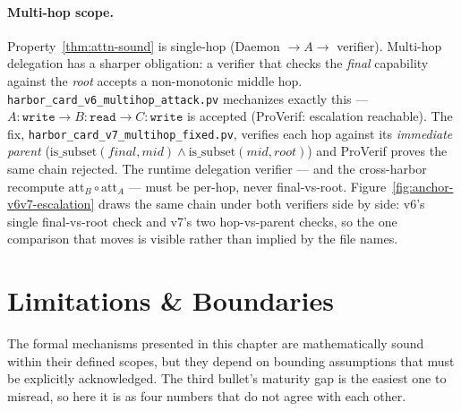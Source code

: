 \documentclass[11pt,a4paper]{article}
\theoremstyle{definition}
\begin{document}
\paragraph{Multi-hop scope.} Property~\ref{thm:attn-sound} is
single-hop (Daemon $\to A \to$ verifier). Multi-hop delegation has a sharper
obligation: a verifier that checks the \emph{final} capability against the
\emph{root} accepts a non-monotonic middle hop. \texttt{harbor\_card\_v6\_multihop\_attack.pv}
mechanizes exactly this --- $A{:}\texttt{write} \to B{:}\texttt{read} \to
C{:}\texttt{write}$ is accepted (ProVerif: escalation reachable). The fix,
\texttt{harbor\_card\_v7\_multihop\_fixed.pv}, verifies each hop against its
\emph{immediate parent} ($\mathrm{is\_subset}(\mathit{final},\mathit{mid}) \wedge
\mathrm{is\_subset}(\mathit{mid},\mathit{root})$) and ProVerif proves the same
chain rejected. The runtime delegation verifier --- and the cross-harbor
recompute $\mathrm{att}_B \circ \mathrm{att}_A$ --- must be per-hop, never
final-vs-root. Figure~\ref{fig:anchor-v6v7-escalation} draws the same chain
under both verifiers side by side: v6's single final-vs-root check and v7's
two hop-vs-parent checks, so the one comparison that moves is visible rather
than implied by the file names.



\pdexercisepointer{\ref{ex:anchor-multihop-induction}}{\ref{ex:anchor-macaroon-discharge}}{\pageref{ex:anchor-multihop-induction}}

\section{Limitations \& Boundaries}\label{sec:anchor-limitations-boundaries}

The formal mechanisms presented in this chapter are mathematically sound within their defined scopes, but they depend on bounding assumptions that must be explicitly acknowledged. The third bullet's maturity gap is the easiest one to misread, so here it is as four numbers that do not agree with each other.
\end{document}
